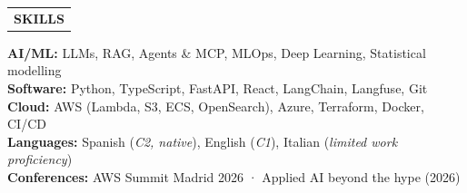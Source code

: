 \documentclass[11pt]{article}
\renewcommand{\section}[1]{}
\newcommand{\mpwidth}{\linewidth-\fboxsep-\fboxsep}
\newcommand{\cvtext}[1]{%
 \begin{tabular*}{1\mpwidth}{p{\mpwidth}}
  \parbox{1\mpwidth}{#1}
 \end{tabular*}%
}
\newcommand{\cvsection}[1]{%
 \vspace{8pt}
 \cvtext{%
  \textbf{\Large{\textcolor{primary}{\uppercase{#1}}}}\\[2pt]
 }%
}
\begin{document}
\vspace{-0.5em}

\section{Skills}
\cvsection{Skills}

\vspace{-0.5em}

\hspace{0.5em}\parbox{\dimexpr\linewidth}{
\textbf{AI/ML:} LLMs, RAG, Agents \& MCP, MLOps, Deep Learning, Statistical modelling \\[0.2em]
\textbf{Software:} Python, TypeScript, FastAPI, React, LangChain, Langfuse, Git \\[0.2em]
\textbf{Cloud:} AWS (Lambda, S3, ECS, OpenSearch), Azure, Terraform, Docker, CI/CD \\[0.2em]
\textbf{Languages:} Spanish (\textit{C2, native}), English (\textit{C1}), Italian (\textit{limited work proficiency}) \\[0.2em]
\textbf{Conferences:} AWS Summit Madrid 2026 · Applied AI beyond the hype (2026)
}
\end{document}

